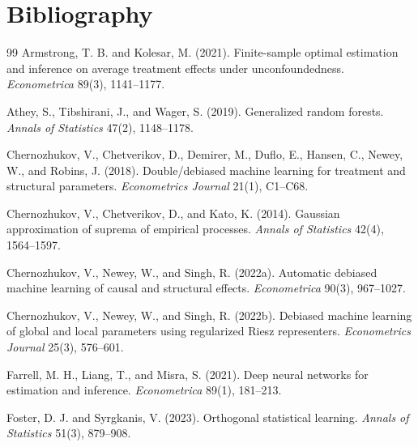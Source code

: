 \documentclass[11pt]{article}
\theoremstyle{definition}
\theoremstyle{plain}
\theoremstyle{remark}
\begin{document}
\section*{Bibliography}
\begin{thebibliography}{99}
Armstrong, T. B. and Kolesar, M. (2021).
\newblock Finite-sample optimal estimation and inference on average treatment effects under unconfoundedness.
\newblock \emph{Econometrica} 89(3), 1141--1177.

Athey, S., Tibshirani, J., and Wager, S. (2019).
\newblock Generalized random forests.
\newblock \emph{Annals of Statistics} 47(2), 1148--1178.

Chernozhukov, V., Chetverikov, D., Demirer, M., Duflo, E., Hansen, C., Newey, W., and Robins, J. (2018).
\newblock Double/debiased machine learning for treatment and structural parameters.
\newblock \emph{Econometrics Journal} 21(1), C1--C68.

Chernozhukov, V., Chetverikov, D., and Kato, K. (2014).
\newblock Gaussian approximation of suprema of empirical processes.
\newblock \emph{Annals of Statistics} 42(4), 1564--1597.

Chernozhukov, V., Newey, W., and Singh, R. (2022a).
\newblock Automatic debiased machine learning of causal and structural effects.
\newblock \emph{Econometrica} 90(3), 967--1027.

Chernozhukov, V., Newey, W., and Singh, R. (2022b).
\newblock Debiased machine learning of global and local parameters using regularized Riesz representers.
\newblock \emph{Econometrics Journal} 25(3), 576--601.

Farrell, M. H., Liang, T., and Misra, S. (2021).
\newblock Deep neural networks for estimation and inference.
\newblock \emph{Econometrica} 89(1), 181--213.

Foster, D. J. and Syrgkanis, V. (2023).
\newblock Orthogonal statistical learning.
\newblock \emph{Annals of Statistics} 51(3), 879--908.


\end{thebibliography}
\end{document}
